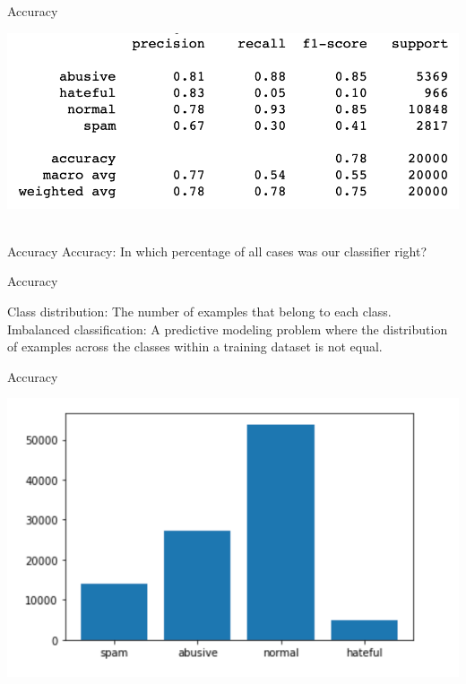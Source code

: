 \documentclass[compress]{beamer}
\begin{document}
\begin{frame}[fragile]{Accuracy}
	
\begin{center}
	\includegraphics[width=\linewidth,height=\textheight,keepaspectratio]{../pictures/classification-report} \\\
\end{center}
	
\end{frame}

\begin{frame}{Accuracy}
Accuracy: In which percentage of all cases was our classifier right? \\

\end{frame}


\begin{frame}{Accuracy}
	
Class distribution: The number of examples that belong to each class. \\
	
Imbalanced classification: A predictive modeling problem where the distribution of examples across the classes within a training dataset is not equal.
	
\end{frame}


\begin{frame}[fragile]{Accuracy}
\begin{center}
	\includegraphics[width=\linewidth,height=\textheight,keepaspectratio]{../pictures/barplot} \\\
\end{center}
\end{frame}
\end{document}
